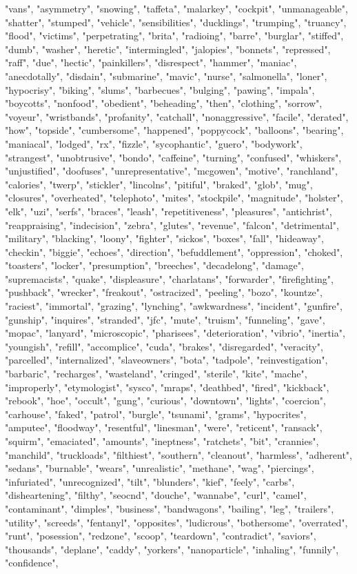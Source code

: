 "vans", "asymmetry", "snowing", "taffeta", "malarkey", "cockpit", "unmanageable", "shatter", "stumped", "vehicle", "sensibilities", "ducklings", "trumping", "truancy", "flood", "victims", "perpetrating", "brita", "radioing", "barre", "burglar", "stiffed", "dumb", "washer", "heretic", "intermingled", "jalopies", "bonnets", "repressed", "raff", "due", "hectic", "painkillers", "disrespect", "hammer", "maniac", "anecdotally", "disdain", "submarine", "mavic", "nurse", "salmonella", "loner", "hypocrisy", "biking", "slums", "barbecues", "bulging", "pawing", "impala", "boycotts", "nonfood", "obedient", "beheading", "then", "clothing", "sorrow", "voyeur", "wristbands", "profanity", "catchall", "nonaggressive", "facile", "derated", "how", "topside", "cumbersome", "happened", "poppycock", "balloons", "bearing", "maniacal", "lodged", "rx", "fizzle", "sycophantic", "guero", "bodywork", "strangest", "unobtrusive", "bondo", "caffeine", "turning", "confused", "whiskers", "unjustified", "doofuses", "unrepresentative", "mcgowen", "motive", "ranchland", "calories", "twerp", "stickler", "lincolns", "pitiful", "braked", "glob", "mug", "closures", "overheated", "telephoto", "mites", "stockpile", "magnitude", "holster", "elk", "uzi", "serfs", "braces", "leash", "repetitiveness", "pleasures", "antichrist", "reappraising", "indecision", "zebra", "glutes", "revenue", "falcon", "detrimental", "military", "blacking", "loony", "fighter", "sickos", "boxes", "fall", "hideaway", "checkin", "biggie", "echoes", "direction", "befuddlement", "oppression", "choked", "toasters", "locker", "presumption", "breeches", "decadelong", "damage", "supremacists", "quake", "displeasure", "charlatans", "forwarder", "firefighting", "pushback", "wrecker", "freakout", "ostracized", "peeling", "bozo", "kountze", "raciest", "immortal", "grazing", "lynching", "awkwardness", "incident", "gunfire", "gunship", "inquires", "stranded", "jfc", "mute", "truism", "funneling", "gave", "mopac", "lanyard", "microscopic", "pharisees", "deterioration", "vibrio", "inertia", "youngish", "refill", "accomplice", "cuda", "brakes", "disregarded", "veracity", "parcelled", "internalized", "slaveowners", "bota", "tadpole", "reinvestigation", "barbaric", "recharges", "wasteland", "cringed", "sterile", "kite", "mache", "improperly", "etymologist", "sysco", "mraps", "deathbed", "fired", "kickback", "rebook", "hoe", "occult", "gung", "curious", "downtown", "lights", "coercion", "carhouse", "faked", "patrol", "burgle", "tsunami", "grams", "hypocrites", "amputee", "floodway", "resentful", "linesman", "were", "reticent", "ransack", "squirm", "emaciated", "amounts", "ineptness", "ratchets", "bit", "crannies", "manchild", "truckloads", "filthiest", "southern", "cleanout", "harmless", "adherent", "sedans", "burnable", "wears", "unrealistic", "methane", "wag", "piercings", "infuriated", "unrecognized", "tilt", "blunders", "kief", "feely", "carbs", "disheartening", "filthy", "seocnd", "douche", "wannabe", "curl", "camel", "contaminant", "dimples", "business", "bandwagons", "bailing", "leg", "trailers", "utility", "screeds", "fentanyl", "opposites", "ludicrous", "bothersome", "overrated", "runt", "posession", "redzone", "scoop", "teardown", "contradict", "saviors", "thousands", "deplane", "caddy", "yorkers", "nanoparticle", "inhaling", "funnily", "confidence", 